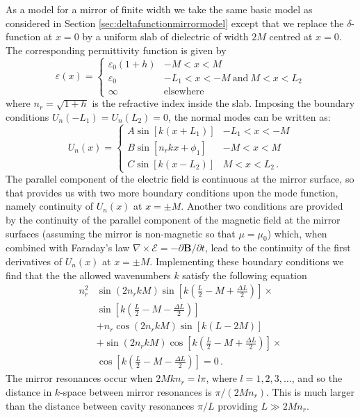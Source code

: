 \documentclass[twocolumn,english,pra,aps,superscriptaddress,floatfix]{revtex4-1}
\begin{document}
As a model for a mirror of finite width we take the same basic model as considered in Section \ref{sec:deltafunctionmirrormodel} except that we replace the $\delta$-function at $x=0$ by a uniform slab of dielectric of width $2M$ centred at $x=0$. The corresponding permittivity function is given by 
\[\varepsilon(x)=\begin{cases}
\varepsilon_{0}\left(1+h\right) & -M<x<M\\
\varepsilon_{0} & -L_{1}<x<-M\ \mbox{and} \ M<x<L_{2}\\
\infty & \mbox{elsewhere} \end{cases}\]
where $n_{r}=\sqrt{1+h}$ is the refractive index inside the slab.
Imposing the boundary conditions $U_{n}(-L_{1})=U_{n}(L_{2})=0$, the
normal modes can be written as:\[
U_{n}(x)=\begin{cases}
A \sin[k(x+L_{1})] & -L_{1}<x<-M\\
B \sin[n_{r}kx+\phi_{1}] & -M<x<M\\
C \sin[k(x-L_{2})] & M<x<L_{2} \, .
\end{cases}\]
The parallel component of the electric field is continuous at the mirror surface, so that provides us with two more boundary conditions upon the mode function, namely continuity of $U_{n}(x)$ at $x=\pm M$. Another two conditions are provided by the continuity of the parallel component of the magnetic field at the mirror surfaces (assuming the mirror is non-magnetic so that $\mu=\mu_{0}$) which, when combined with Faraday's law $\nabla \times \mathbf{\mathcal{E}}= - \partial \mathbf{B} / \partial t$, lead to the continuity of the first derivatives of $U_{n}(x)$ at $x=\pm M$. Implementing these boundary conditions we
find that the the allowed wavenumbers $k$
 satisfy the following equation 
 \begin{equation}
\begin{split}
n_{r}^{2} & \sin(2n_{r} k M) \sin\left[k\left(\frac{L}{2}-M+\frac{\Delta L}{2}\right)\right]\times
\\ &
\sin\left[k\left(\frac{L}{2}-M-\frac{\Delta L}{2}\right)\right] \\ & +n_{r} \cos(2n_{r}k M)\sin[k(L-2 M)]\\ & +
\sin(2n_{r} k M)\cos\left[k\left(\frac{L}{2}-M+\frac{\Delta L}{2}\right)\right]\times
\\ & 
\cos\left[k\left(\frac{L}{2}-M-\frac{\Delta L}{2}\right)\right]=0 \, .
\end{split}
\end{equation}
The mirror resonances occur when $2M k n_{r} = l \pi$, where $l=1,2,3, \ldots$, and so the distance in $k$-space between mirror resonances is $\pi/(2Mn_{r})$. This is much larger than the distance between cavity resonances $\pi / L$ providing $L \gg 2 M n_{r}$.
\end{document}
